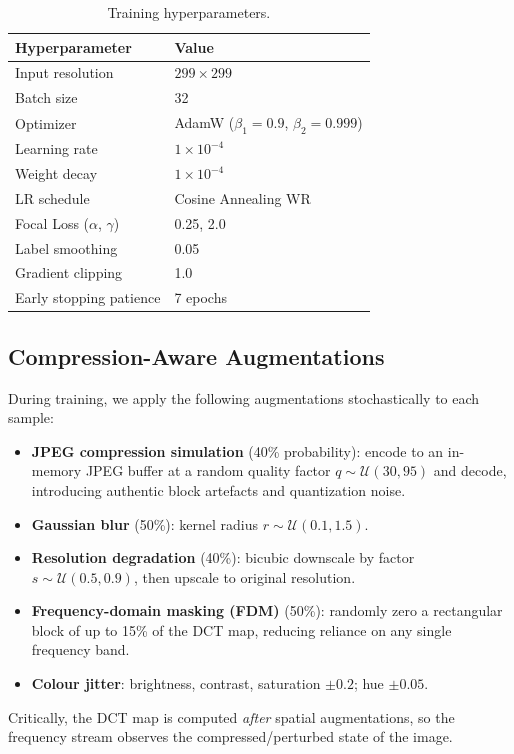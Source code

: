 \documentclass[conference]{IEEEtran}
\begin{document}
\begin{table}[t]
\centering
\caption{Training hyperparameters.}
\label{tab:hparams}
\begin{tabular}{ll}
\toprule
\textbf{Hyperparameter} & \textbf{Value} \\
\midrule
Input resolution & $299\times299$ \\
Batch size & 32 \\
Optimizer & AdamW ($\beta_1{=}0.9$, $\beta_2{=}0.999$) \\
Learning rate & $1\times10^{-4}$ \\
Weight decay & $1\times10^{-4}$ \\
LR schedule & Cosine Annealing WR \\
Focal Loss ($\alpha$, $\gamma$) & 0.25, 2.0 \\
Label smoothing & 0.05 \\
Gradient clipping & 1.0 \\
Early stopping patience & 7 epochs \\
\bottomrule
\end{tabular}
\end{table}

\subsection{Compression-Aware Augmentations}
During training, we apply the following augmentations stochastically to each sample:
\begin{itemize}
  \item \textbf{JPEG compression simulation} (40\% probability): encode to an in-memory JPEG buffer at a random quality factor $q\sim\mathcal{U}(30,95)$ and decode, introducing authentic block artefacts and quantization noise.
  \item \textbf{Gaussian blur} (50\%): kernel radius $r\sim\mathcal{U}(0.1,1.5)$.
  \item \textbf{Resolution degradation} (40\%): bicubic downscale by factor $s\sim\mathcal{U}(0.5,0.9)$, then upscale to original resolution.
  \item \textbf{Frequency-domain masking (FDM)} (50\%): randomly zero a rectangular block of up to 15\% of the DCT map, reducing reliance on any single frequency band.
  \item \textbf{Colour jitter}: brightness, contrast, saturation $\pm0.2$; hue $\pm0.05$.
\end{itemize}
Critically, the DCT map is computed \emph{after} spatial augmentations, so the frequency stream observes the compressed/perturbed state of the image.
\end{document}
